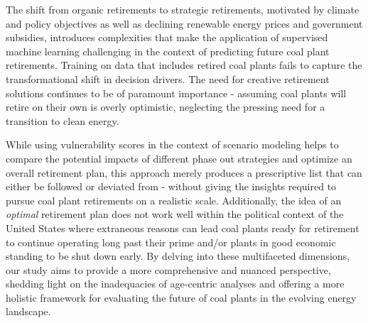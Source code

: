 The shift from organic retirements to strategic retirements, motivated by climate and policy objectives as well as declining renewable
energy prices and government subsidies, introduces complexities 
that make the application of supervised machine learning challenging in the context of predicting future coal plant retirements. 
Training on data that includes retired coal plants fails to capture the transformational shift in decision drivers. The need for 
creative retirement solutions continues to be of paramount importance - assuming coal plants will retire on their own is overly 
optimistic, neglecting the pressing need for a transition to clean energy.


While using vulnerability scores in the context of scenario modeling helps to compare the potential impacts of different phase out strategies and 
optimize an overall retirement plan, this approach merely produces a prescriptive list that can either be followed or deviated from - without giving 
the insights required to pursue coal plant retirements on a realistic scale. Additionally, the idea of an \textit{optimal} retirement plan does not work well 
within the political context of the United States where extraneous reasons can lead coal plants ready for retirement to continue operating long 
past their prime and/or plants in good economic standing to be shut down early. By delving into these multifaceted dimensions, our study aims to provide a 
more comprehensive and nuanced perspective, shedding light on the inadequacies of age-centric analyses and offering a more holistic 
framework for evaluating the future of coal plants in the evolving energy landscape.



